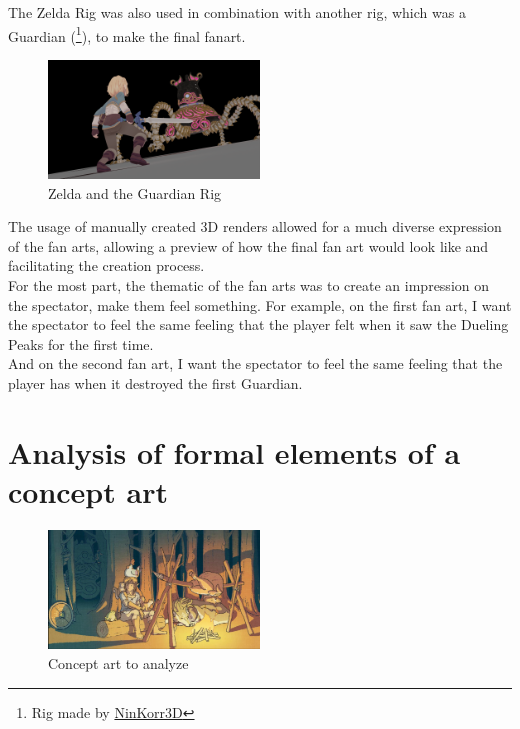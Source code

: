 \documentclass{cup-pan}
\begin{document}
    The Zelda Rig was also used in combination with another rig, which was a Guardian 
    (\footnote{Rig made by 
        \href{https://sketchfab.com/3d-models/guardian-zelda-botw-fan-art-990a6a9434c849329360ea1ef9078895}{NinKorr3D}}), to make the final fanart.
    \begin{figure}[H]
        \includegraphics[width=0.5\textwidth]{Imagenes/Referencias/referencia art 2.png}
        \caption{Zelda and the Guardian Rig}
    \end{figure}

    The usage of manually created 3D renders allowed for a much diverse expression of the fan arts, allowing a preview of how the final fan art would look like and facilitating the creation process.\\

    For the most part, the thematic of the fan arts was to create an impression on the spectator, make them feel something. For example, on the first fan art, I want the spectator to feel the same feeling that the player felt when it saw the Dueling Peaks for the first time. \\

    And on the second fan art, I want the spectator to feel the same feeling that the player has when it destroyed the first Guardian.


\section{Analysis of formal elements of a concept art}
    \begin{figure}[H]
       \includegraphics[width=0.5\textwidth]{Imagenes/Referencias/conceptart_a_analizar.png}
        \caption{Concept art to analyze}
    \end{figure}
\end{document}
